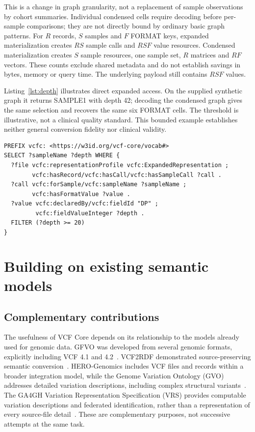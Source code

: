 \documentclass{ceurart}
\begin{document}
This is a change in graph granularity, not a replacement of sample observations by cohort summaries. 
Individual condensed cells require decoding before per-sample comparisons; they are not directly bound by ordinary basic graph patterns. 
For $R$ records, $S$ samples and $F$ FORMAT keys, expanded materialization creates $RS$ sample calls and $RSF$ value resources. 
Condensed materialization creates $S$ sample resources, one sample set, $R$ matrices and $RF$ vectors. 
These counts exclude shared metadata and do not establish savings in bytes, memory or query time. 
The underlying payload still contains $RSF$ values.

Listing~\ref{lst:depth} illustrates direct expanded access. 
On the supplied synthetic graph it returns SAMPLE1 with depth 42; decoding the condensed graph gives the same selection and recovers the same six FORMAT cells. 
The threshold is illustrative, not a clinical quality standard. 
This bounded example establishes neither general conversion fidelity nor clinical validity.

\begin{lstlisting}[float=htbp,caption={An expanded-profile query over the supplied synthetic example.},label={lst:depth}]
PREFIX vcfc: <https://w3id.org/vcf-core/vocab#>
SELECT ?sampleName ?depth WHERE {
  ?file vcfc:representationProfile vcfc:ExpandedRepresentation ;
        vcfc:hasRecord/vcfc:hasCall/vcfc:hasSampleCall ?call .
  ?call vcfc:forSample/vcfc:sampleName ?sampleName ;
        vcfc:hasFormatValue ?value .
  ?value vcfc:declaredBy/vcfc:fieldId "DP" ;
         vcfc:fieldValueInteger ?depth .
  FILTER (?depth >= 20)
}
\end{lstlisting}

\section{Building on existing semantic models}
\label{sec:alignments}

\subsection{Complementary contributions}

The usefulness of VCF Core depends on its relationship to the models already used for genomic data. 
GFVO was developed from several genomic formats, explicitly including VCF 4.1 and 4.2~\cite{baran2015gfvo}. 
VCF2RDF demonstrated source-preserving semantic conversion~\cite{penha2017vcf2rdf}. 
HERO-Genomics includes VCF files and records within a broader integration model, while the Genome Variation Ontology (GVO) addresses detailed variation descriptions, including complex structural variants~\cite{cazzaro2025hero,kawashima2023gvo}. 
The GA4GH Variation Representation Specification (VRS) provides computable variation descriptions and federated identification, rather than a representation of every source-file detail~\cite{wagner2021vrs}. 
These are complementary purposes, not successive attempts at the same task.
\end{document}
